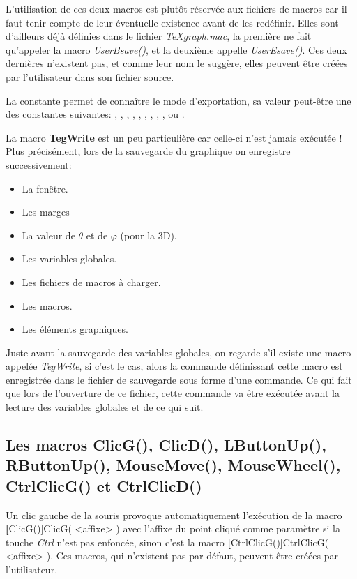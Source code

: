 L'utilisation de ces deux macros est plutôt réservée aux fichiers de macros car il faut tenir compte de leur éventuelle existence avant de les redéfinir. Elles sont d'ailleurs déjà définies dans le fichier \textit{TeXgraph.mac}, la première ne fait qu'appeler la macro \textsl{UserBsave()}, et la deuxième appelle \textsl{UserEsave()}. Ces deux dernières n'existent pas, et comme leur nom le suggère, elles peuvent être créées par l'utilisateur dans son fichier source.

La constante  permet de connaître le mode d'exportation, sa valeur peut-être une des constantes suivantes: , , , , , , , , , ou .

La macro \textbf{TegWrite} est un peu particulière car celle-ci n'est jamais exécutée ! Plus précisément, lors de la
sauvegarde du graphique on enregistre successivement:

\begin{itemize}
 \item La fenêtre.
 \item Les marges
 \item La valeur de $\theta$ et de $\varphi$ (pour la 3D).
 \item Les variables globales.
 \item Les fichiers de macros à charger.
 \item Les macros.
 \item Les éléments graphiques.
\end{itemize}

Juste avant la sauvegarde des variables globales, on regarde s'il existe une macro appelée \textsl{TegWrite}, si c'est le cas, alors la commande définissant cette macro est enregistrée dans le fichier de sauvegarde sous forme d'une commande. Ce qui fait que lors de l'ouverture de ce fichier, cette commande va être exécutée avant la lecture des variables globales et de ce qui suit.


\subsection[Les macros liées à la souris]{Les macros ClicG(), ClicD(), LButtonUp(), RButtonUp(), MouseMove(), MouseWheel(), CtrlClicG() et CtrlClicD()}

Un clic gauche de la souris provoque automatiquement l'exécution de la macro \textbf[ClicG()]{ClicG( <affixe> )} avec l'affixe du point cliqué comme paramètre si la touche \textsl{Ctrl} n'est pas enfoncée, sinon c'est la macro \textbf[CtrlClicG()]{CtrlClicG( <affixe> )}. Ces macros, qui n'existent pas par défaut, peuvent être créées par l'utilisateur.

